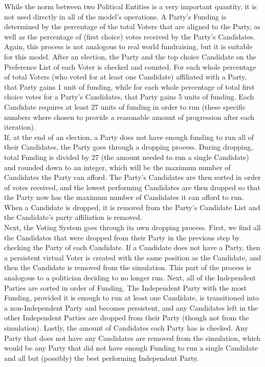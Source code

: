 \documentclass[12pt]{article}
\newcounter{step}
\begin{document}
\qquad While the norm between two Political Entities is a very important quantity, it is not used directly in all of the model's operations. A Party's Funding is determined by the percentage of the total Voters that are aligned to the Party, as well as the percentage of (first choice) votes received by the Party's Candidates. Again, this process is not analogous to real world fundraising, but it is suitable for this model. After an election, the Party and the top choice Candidate on the Preference List of each Voter is checked and counted. For each whole percentage of total Voters (who voted for at least one Candidate) affiliated with a Party, that Party gains 1 unit of funding, while for each whole percentage of total first choice votes for a Party's Candidates, that Party gains 5 units of funding. Each Candidate requires at least 27 units of funding in order to run (these specific numbers where chosen to provide a reasonable amount of progression after each iteration). \\

\qquad If, at the end of an election, a Party does not have enough funding to run all of their Candidates, the Party goes through a dropping process. During dropping, total Funding is divided by 27 (the amount needed to run a single Candidate) and rounded down to an integer, which will be the maximum number of Candidates the Party can afford. The Party's Candidates are then sorted in order of votes received, and the lowest performing Candidates are then dropped so that the Party now has the maximum number of Candidates it can afford to run. When a Candidate is dropped, it is removed from the Party's Candidate List and the Candidate's party affiliation is removed. \\

\qquad Next, the Voting System goes through its own dropping process. First, we find all the Candidates that were dropped from their Party in the previous step by checking the Party of each Candidate. If a Candidate does not have a Party, then a persistent virtual Voter is created with the same position as the Candidate, and then the Candidate is removed from the simulation. This part of the process is analogous to a politician deciding to no longer run. Next, all of the Independent Parties are sorted in order of Funding. The Independent Party with the most Funding, provided it is enough to run at least one Candidate, is transitioned into a non-Independent Party and becomes persistent, and any Candidates left in the other Independent Parties are dropped from their Party (though not from the simulation). Lastly, the amount of Candidates each Party has is checked. Any Party that does not have any Candidates are removed from the simulation, which would be any Party that did not have enough Funding to run a single Candidate and all but (possibly) the best performing Independent Party. \\
\end{document}
